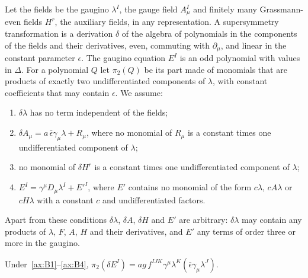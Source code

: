 Let the fields be the gaugino $\lambda^I$, the gauge field $A^I_\mu$ and finitely many Grassmann-even fields $H^r$, the auxiliary fields, in any representation. A supersymmetry transformation is a derivation $\delta$ of the algebra of polynomials in the components of the fields and their derivatives, even, commuting with $\partial_\mu$, and linear in the constant parameter $\epsilon$. The gaugino equation $E^I$ is an odd polynomial with values in $\Delta$. For a polynomial $Q$ let $\pi_2(Q)$ be its part made of monomials that are products of exactly two undifferentiated components of $\lambda$, with constant coefficients that may contain $\epsilon$. We assume:
\begin{enumerate}[label=(B\arabic*)]
\item\label{ax:B1} $\delta\lambda$ has no term independent of the fields;
\item\label{ax:B2} $\delta A_\mu=a\,\bar\epsilon\gamma_\mu\lambda+R_\mu$, where no monomial of $R_\mu$ is a constant times one undifferentiated component of $\lambda$;
\item\label{ax:B3} no monomial of $\delta H^r$ is a constant times one undifferentiated component of $\lambda$;
\item\label{ax:B4} $E^I=\gamma^\mu D_\mu\lambda^I+E'^I$, where $E'$ contains no monomial of the form $c\lambda$, $cA\lambda$ or $cH\lambda$ with a constant $c$ and undifferentiated factors.
\end{enumerate}
Apart from these conditions $\delta\lambda$, $\delta A$, $\delta H$ and $E'$ are arbitrary: $\delta\lambda$ may contain any products of $\lambda$, $F$, $A$, $H$ and their derivatives, and $E'$ any terms of order three or more in the gaugino.

\begin{lemma}
\label{lem:puresector}
Under~\ref{ax:B1}--\ref{ax:B4}, $\pi_2(\delta E^I)=ag\,f^{IJK}\gamma^\mu\lambda^K(\bar\epsilon\gamma_\mu\lambda^J)$.
\end{lemma}

